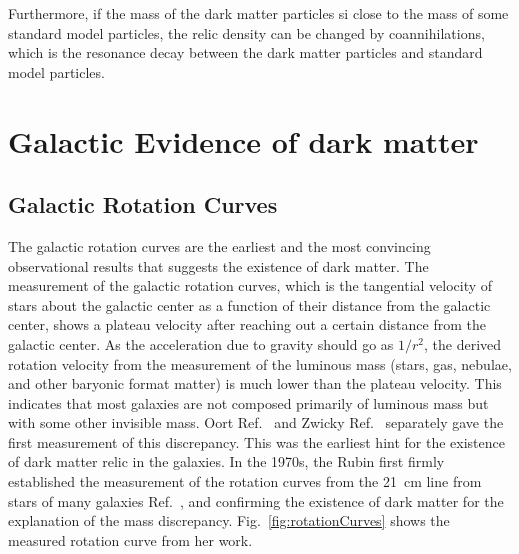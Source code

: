 Furthermore, if the mass of the dark matter particles si close to the mass of some standard model particles, the relic density can be changed by coannihilations, which is the resonance decay between the dark matter particles and standard model particles.

\section{Galactic Evidence of dark matter}
\subsection{Galactic Rotation Curves}
The galactic rotation curves are the earliest and the most convincing observational results that suggests the existence of dark matter. The measurement of the galactic rotation curves, which is the tangential velocity of stars about the galactic center as a function of their distance from the galactic center, shows a plateau velocity after reaching out a certain distance from the galactic center. As the acceleration due to gravity should go as $1/r^2$, the derived rotation velocity from the measurement of the luminous mass (stars, gas, nebulae, and other baryonic format matter) is much lower than the plateau velocity. This indicates that most galaxies are not composed primarily of luminous mass but with some other invisible mass. Oort Ref.~\cite{Oort1932} and Zwicky Ref.~\cite{Zwicky1933} separately gave the first measurement of this discrepancy. This was the earliest hint for the existence of dark matter relic in the galaxies. In the 1970s, the Rubin first firmly established the measurement of the rotation curves from the \SI{21}{\cm} line from stars of many galaxies Ref.~\cite{Rubin1983}, and confirming the existence of dark matter for the explanation of the mass discrepancy. Fig.~\ref{fig:rotationCurves} shows the measured rotation curve from her work. 
 
